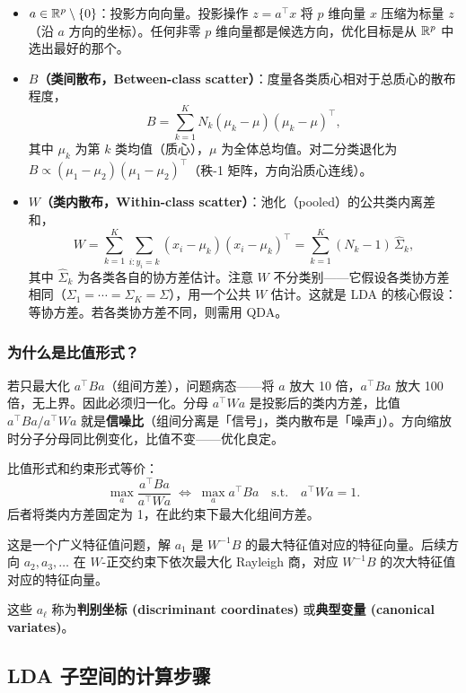 \begin{itemize}
    \item \textbf{$a \in \mathbb{R}^p \setminus \{0\}$}：投影方向向量。投影操作 $z = a^\top x$ 将 $p$ 维向量 $x$ 压缩为标量 $z$（沿 $a$ 方向的坐标）。任何非零 $p$ 维向量都是候选方向，优化目标是从 $\mathbb{R}^p$ 中选出最好的那个。

    \item \textbf{$B$（类间散布，Between-class scatter）}：度量各类质心相对于总质心的散布程度，
    \[
    B = \sum_{k=1}^{K} N_k (\mu_k - \mu)(\mu_k - \mu)^\top,
    \]
    其中 $\mu_k$ 为第 $k$ 类均值（质心），$\mu$ 为全体总均值。对二分类退化为 $B \propto (\mu_1 - \mu_2)(\mu_1 - \mu_2)^\top$（秩-1 矩阵，方向沿质心连线）。

    \item \textbf{$W$（类内散布，Within-class scatter）}：池化（pooled）的公共类内离差和，
    \[
    W = \sum_{k=1}^{K} \sum_{i: y_i = k} (x_i - \mu_k)(x_i - \mu_k)^\top
      = \sum_{k=1}^{K} (N_k - 1)\, \hat{\Sigma}_k,
    \]
    其中 $\hat{\Sigma}_k$ 为各类各自的协方差估计。注意 $W$ 不分类别——它假设各类协方差相同（$\Sigma_1 = \cdots = \Sigma_K = \Sigma$），用一个公共 $W$ 估计。这就是 LDA 的核心假设：等协方差。若各类协方差不同，则需用 QDA。
\end{itemize}

\subsubsection{为什么是比值形式？}

若只最大化 $a^\top B a$（组间方差），问题病态——将 $a$ 放大 10 倍，$a^\top B a$ 放大 100 倍，无上界。因此必须归一化。分母 $a^\top W a$ 是投影后的类内方差，比值 $a^\top B a / a^\top W a$ 就是\textbf{信噪比}（组间分离是「信号」，类内散布是「噪声」）。方向缩放时分子分母同比例变化，比值不变——优化良定。

比值形式和约束形式等价：
\[
\max_{a} \frac{a^\top B a}{a^\top W a}
\;\Longleftrightarrow\;
\max_{a} a^\top B a \quad \text{s.t.} \quad a^\top W a = 1.
\]
后者将类内方差固定为 1，在此约束下最大化组间方差。

这是一个广义特征值问题，解 $a_1$ 是 $W^{-1}B$ 的最大特征值对应的特征向量。后续方向 $a_2, a_3, \ldots$ 在 $W$-正交约束下依次最大化 Rayleigh 商，对应 $W^{-1}B$ 的次大特征值对应的特征向量。

这些 $a_\ell$ 称为\textbf{判别坐标 (discriminant coordinates)} 或\textbf{典型变量 (canonical variates)}。

\subsection{LDA 子空间的计算步骤}

